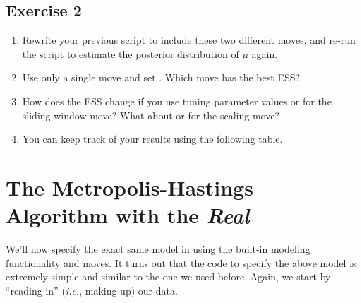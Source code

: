 \subsection{Exercise 2}

\begin{enumerate}[label=\textnormal{Step \arabic*)},leftmargin=1.5cm]
	\item Rewrite your previous script to include these two different moves, and re-run the script to estimate the posterior distribution of $\mu$ again.
	\item Use only a single move and set . Which move has the best ESS?
	\item How does the ESS change if you use tuning parameter values  or  for the sliding-window move? What about  or  for the scaling move?
	\item You can keep track of your results using the following table.
\end{enumerate}
\begin{Form}
\begin{table}[h!]
\centering
\caption{\small Effective sample sizes (ESS) for two moves at three different tuning parameter values}
\label{tab:pp}
\end{table}
\end{Form}

\section{The Metropolis-Hastings Algorithm with the \emph{Real} \RevBayes}
We'll now specify the exact same model in \Rev using the built-in modeling functionality and moves.
It turns out that the \Rev code to specify the above model is extremely simple and similar to the one we used before.
Again, we start by ``reading in'' (\emph{i.e.}, making up) our data.

